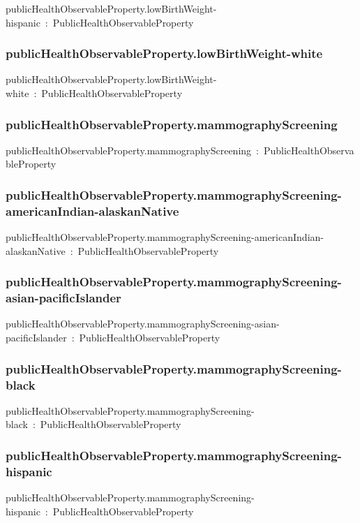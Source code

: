 \documentclass{article}
\begin{document}
publicHealthObservableProperty.lowBirthWeight-hispanic~:~PublicHealthObservableProperty

\subsubsection*{publicHealthObservableProperty.lowBirthWeight-white}

publicHealthObservableProperty.lowBirthWeight-white~:~PublicHealthObservableProperty

\subsubsection*{publicHealthObservableProperty.mammographyScreening}

publicHealthObservableProperty.mammographyScreening~:~PublicHealthObservableProperty

\subsubsection*{publicHealthObservableProperty.mammographyScreening-americanIndian-alaskanNative}

publicHealthObservableProperty.mammographyScreening-americanIndian-alaskanNative~:~PublicHealthObservableProperty

\subsubsection*{publicHealthObservableProperty.mammographyScreening-asian-pacificIslander}

publicHealthObservableProperty.mammographyScreening-asian-pacificIslander~:~PublicHealthObservableProperty

\subsubsection*{publicHealthObservableProperty.mammographyScreening-black}

publicHealthObservableProperty.mammographyScreening-black~:~PublicHealthObservableProperty

\subsubsection*{publicHealthObservableProperty.mammographyScreening-hispanic}

publicHealthObservableProperty.mammographyScreening-hispanic~:~PublicHealthObservableProperty
\end{document}
